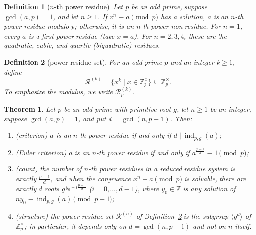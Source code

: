 \documentclass[11pt]{article}
\theoremstyle{ntstyle}
\newtheorem{theorem}{Theorem}[subsection]
\newtheorem{definition}{Definition}[subsection]
\newcommand{\ZmodUnits}[1]{\mathbb{Z}_{#1}^{\times}}
\DeclareMathOperator{\ind}{ind}
\begin{document}
\begin{definition}[$n$-th power residue]\label{def:7.7.1}
	Let $p$ be an odd prime, suppose $\gcd(a, p) = 1$, and let $n \ge 1$. If $x^{n} \equiv a
		\pmod{p}$ has a solution, $a$ is an $n$-th power residue modulo $p$;
	otherwise, it is an $n$-th power non-residue. For $n = 1$, every $a$ is a
	first power residue (take $x = a$). For $n = 2, 3, 4$, these are
	the quadratic, cubic, and quartic (biquadratic) residues.

\end{definition}
\begin{definition}[power-residue set]\label{def:7.7.2} For an odd
	prime $p$ and an integer $k\ge1$, define
	\[
		\mathcal{R}^{(k)}=\{x^k \mid x\in\ZmodUnits{p}\}
		\subseteq\ZmodUnits{p}.
	\]
	To emphasize the modulus, we write $\mathcal{R}_p^{(k)}$.

\end{definition}
\begin{theorem}\label{thm:7.7.1} Let $p$ be an odd
	prime with primitive root $g$, let $n\ge1$ be an integer, suppose
	$\gcd(a, p) = 1$, and put $d = \gcd(n, p-1)$. Then:

	\begin{enumerate}[label={\alph*)}]
		\item (criterion) $a$ is an $n$-th power residue if and only if $d \mid
			      \ind_{p,g}(a)$;
		\item (Euler criterion) $a$ is an $n$-th power residue if and only if
			      $a^{\frac{p-1}{d}} \equiv 1 \pmod{p}$;
		\item (count) the number of $n$-th power residues in a reduced residue system is exactly
		      $\frac{p-1}{d}$, and when the congruence $x^{n} \equiv a \pmod{p}$ is solvable, there are
		      exactly $d$ roots $g^{\,y_0 + i\frac{p-1}{d}}$ ($i = 0, \ldots, d-1$),
		      where $y_0\in\mathbb{Z}$ is any solution of
		      $ny_0\equiv\ind_{p,g}(a)\pmod{p-1}$;
		\item (structure) the power-residue set $\mathcal{R}^{(n)}$ of
		      Definition~\ref{def:7.7.2} is the subgroup $\langle g^{d}\rangle$ of
		      $\ZmodUnits{p}$; in
		      particular, it depends only on $d = \gcd(n, p-1)$ and not on $n$ itself.
	\end{enumerate}

\end{theorem}
\end{document}
